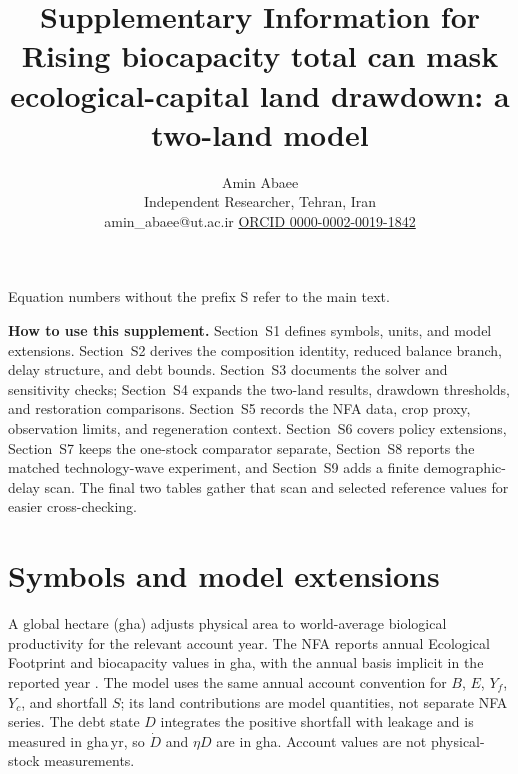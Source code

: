 \documentclass[11pt,a4paper]{article}
\title{Supplementary Information for\\[4pt]
\large Rising biocapacity total can mask ecological-capital land drawdown: a two-land model}
\author{Amin Abaee\\ \small Independent Researcher, Tehran, Iran\\ \small amin\_abaee@ut.ac.ir \quad\href{https://orcid.org/0000-0002-0019-1842}{ORCID 0000-0002-0019-1842}}
\begin{document}
\maketitle

\noindent Equation numbers without the prefix S refer to the main text.

\noindent\textbf{How to use this supplement.} Section~S1 defines symbols, units, and model extensions. Section~S2 derives the composition identity, reduced balance branch, delay structure, and debt bounds. Section~S3 documents the solver and sensitivity checks; Section~S4 expands the two-land results, drawdown thresholds, and restoration comparisons. Section~S5 records the NFA data, crop proxy, observation limits, and regeneration context. Section~S6 covers policy extensions, Section~S7 keeps the one-stock comparator separate, Section~S8 reports the matched technology-wave experiment, and Section~S9 adds a finite demographic-delay scan. The final two tables gather that scan and selected reference values for easier cross-checking.

\section{Symbols and model extensions}\label{si:symbols}

A global hectare (gha) adjusts physical area to world-average biological productivity for the relevant account year. The NFA reports annual Ecological Footprint and biocapacity values in gha, with the annual basis implicit in the reported year \citep{GFNStandards2009,GFNGuidebook2019}. The model uses the same annual account convention for $B$, $E$, $Y_f$, $Y_c$, and shortfall $S$; its land contributions are model quantities, not separate NFA series. The debt state $D$ integrates the positive shortfall with leakage and is measured in gha\,yr, so $\dot D$ and $\eta D$ are in gha. Account values are not physical-stock measurements.
\end{document}
